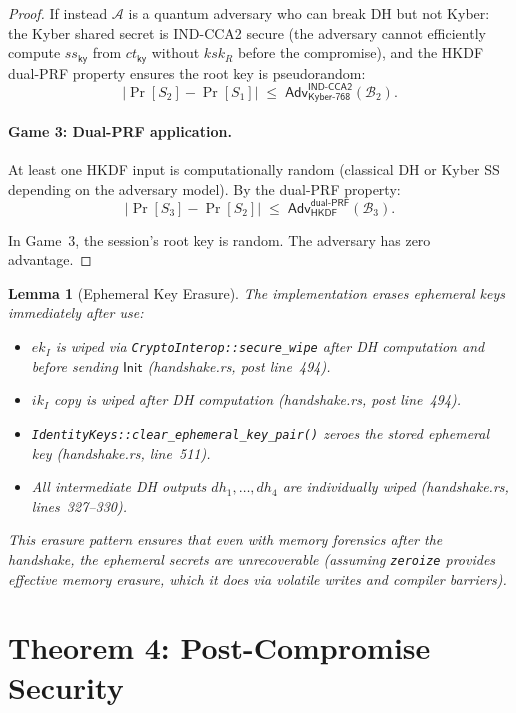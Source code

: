 \documentclass[11pt,a4paper]{article}
\newtheorem{lemma}[theorem]{Lemma}
\theoremstyle{definition}
\theoremstyle{remark}
\newcommand{\adv}{\mathsf{Adv}}
\newcommand{\advA}{\mathcal{A}}
\newcommand{\advB}{\mathcal{B}}
\newcommand{\HKDF}{\mathsf{HKDF}}
\newcommand{\KEM}{\mathsf{Kyber\text{-}768}}
\newcommand{\INDCCA}{\mathsf{IND\text{-}CCA2}}
\newcommand{\dualPRF}{\mathsf{dual\text{-}PRF}}
\begin{document}
\begin{proof}
If instead $\advA$ is a quantum adversary who can break DH but not Kyber:
the Kyber shared secret is IND-CCA2 secure (the adversary cannot efficiently
compute $\mathit{ss}_{\mathsf{ky}}$ from $\mathit{ct}_{\mathsf{ky}}$ without
$\mathit{ksk}_R$ before the compromise), and the HKDF dual-PRF property
ensures the root key is pseudorandom:
\[
  |\Pr[S_2] - \Pr[S_1]| \;\leq\; \adv^{\INDCCA}_{\KEM}(\advB_2).
\]

\paragraph{Game 3: Dual-PRF application.}
At least one HKDF input is computationally random (classical DH or Kyber SS
depending on the adversary model).  By the dual-PRF property:
\[
  |\Pr[S_3] - \Pr[S_2]| \;\leq\; \adv^{\dualPRF}_{\HKDF}(\advB_3).
\]

In Game~3, the session's root key is random.  The adversary has zero
advantage. \qedhere
\end{proof}

\begin{lemma}[Ephemeral Key Erasure]
\label{lem:eph-erasure}
The implementation erases ephemeral keys immediately after use:
\begin{itemize}[nosep]
  \item $ek_I$ is wiped via \texttt{CryptoInterop::secure\_wipe} after DH
        computation and before sending $\mathsf{Init}$
        \emph{(handshake.rs, post line~494)}.
  \item $ik_I$ copy is wiped after DH computation
        \emph{(handshake.rs, post line~494)}.
  \item \texttt{IdentityKeys::clear\_ephemeral\_key\_pair()} zeroes the
        stored ephemeral key \emph{(handshake.rs, line~511)}.
  \item All intermediate DH outputs $\mathit{dh}_1, \ldots, \mathit{dh}_4$
        are individually wiped \emph{(handshake.rs, lines~327--330)}.
\end{itemize}
This erasure pattern ensures that even with memory forensics \emph{after} the
handshake, the ephemeral secrets are unrecoverable (assuming
\texttt{zeroize} provides effective memory erasure, which it does via
volatile writes and compiler barriers).
\end{lemma}


\section{Theorem 4: Post-Compromise Security}
\label{sec:thm4}
\end{document}
